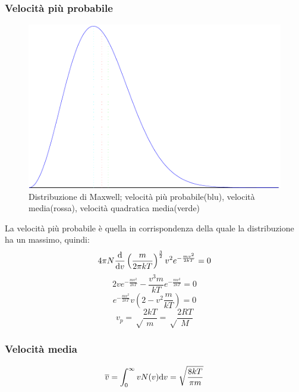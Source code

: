 \subsubsection{Velocità più probabile}
\begin{figure}[htbp]
\centering
\includegraphics[scale=0.5]{immagini/fisica1/maxwell}
\caption{Distribuzione di Maxwell; velocità più probabile(blu), velocità media(rossa), velocità quadratica media(verde)}
\end{figure}
La velocità più probabile è quella in corrispondenza della quale la distribuzione ha un massimo, quindi:
\begin{equation*}4\pi N\frac{\mathrm{d}}{\mathrm{d} v}\left(\frac{m}{2\pi kT}\right)^{\frac{3}{2}}v^2e^{-\frac{mv^2}{2kT}}=0\end{equation*}
\begin{equation*}2ve^{-\frac{mv^2}{2kT}}-\frac{v^3m}{kT}e^{-\frac{mv^2}{2kT}}=0\end{equation*}
\begin{equation*}e^{-\frac{mv^2}{2kT}}v\left(2-v^2\frac{m}{kT}\right)=0\end{equation*}
\begin{equation}
v_p=\sqrt\frac{2kT}{m}=\sqrt\frac{2RT}{M}
\end{equation}

\subsubsection{Velocità media}
\begin{equation}
\overline{v}=\int_0^\infty vN(v)\mathrm{d} v=\sqrt\frac{8kT}{\pi m}
\end{equation}

